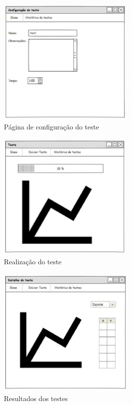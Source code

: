 	\begin{figure}[h]
		\centering
		\includegraphics[width=0.6\textwidth]{resource/configteste.eps}
		\caption{Página de configuração do teste}
		\label{img:conf}
	\end{figure}

	
	\begin{figure}[h]
		\centering
		\includegraphics[width=0.6\textwidth]{resource/teste.eps}
		\caption{Realização do teste}
		\label{img:teste}
	\end{figure}


	\begin{figure}[h]
		\centering
		\includegraphics[width=0.6\textwidth]{resource/detalheteste.eps}
		\caption{Resultados dos testes}
		\label{img:detalhe}
	\end{figure}

